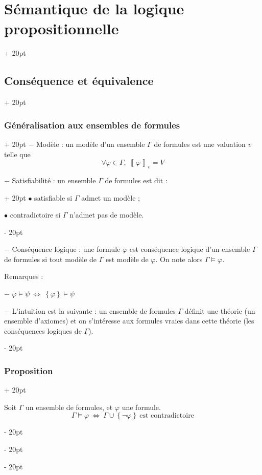 \documentclass[a4paper, 12pt, twoside]{article}
\newcommand{\lrbb}[1]{\left\llbracket #1 \right\rrbracket}
\newcommand{\set}[1]{\left\{ #1 \right\}}
\newcommand{\ssi}{\ \Leftrightarrow \ }
\newcommand{\ind}[1][20pt]{\advance\leftskip + #1}
\newcommand{\deind}[1][20pt]{\advance\leftskip - #1}
\newenvironment{indt}[2][20pt]{#2 \par \ind[#1]}{\par \deind} %
\begin{document}
\begin{indt}{\section{Sémantique de la logique propositionnelle}}
\begin{indt}{\subsection{Conséquence et équivalence}}
            \vspace{12pt}
            
            \begin{indt}{\subsubsection{Généralisation aux ensembles de formules}}
                $-$ Modèle : un modèle d'un ensemble $\Gamma$ de formules est une valuation $v$ telle que
                    \[ \forall \varphi \in \Gamma,\ \lrbb{\varphi}_v = V \]
                
                \begin{indt}{$-$ Satisfiabilité : un ensemble $\Gamma$ de formules est dit :}
                    $\bullet$ satisfiable si $\Gamma$ admet un modèle ;
                    
                    $\bullet$ contradictoire si $\Gamma$ n'admet pas de modèle.
                \end{indt}
                
                \vspace{12pt}
                
                $-$ Conséquence logique : une formule $\varphi$ est conséquence logique d'un ensemble $\Gamma$ de formules si tout modèle de $\Gamma$ est modèle de $\varphi$. On note alors $\Gamma \vDash \varphi$.
                
                \vspace{12pt}
                
                Remarques :
                
                $-$ $\varphi \vDash \psi \ssi \set \varphi \vDash \psi$
                
                $-$ L'intuition est la suivante : un ensemble de formules $\Gamma$ définit une théorie (un ensemble d'axiomes) et on s'intéresse aux formules vraies dans cette théorie (les conséquences logiques de $\Gamma$).
            \end{indt}
            
            \vspace{12pt}
            
            \begin{indt}{\subsubsection{Proposition}}
                \begin{pseudocode}
                    Soit $\Gamma$ un ensemble de formules, et $\varphi$ une formule.
                        \[ \Gamma \vDash \varphi \ssi \Gamma \cup \set{\neg \varphi}\ \text{est contradictoire} \]
                \end{pseudocode}
                

\end{indt}
\end{indt}
\end{indt}
\end{document}
